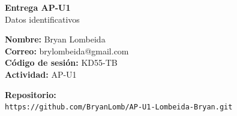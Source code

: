 \documentclass[12pt]{article}
\begin{document}
\begin{center}
  {\Large \bfseries Entrega AP-U1}\\[0.4em]
  Datos identificativos
\end{center}

\vspace{1em}

\noindent
\textbf{Nombre:} Bryan Lombeida\\
\textbf{Correo:} brylombeida@gmail.com\\
\textbf{Código de sesión:} KD55-TB\\
\textbf{Actividad:} AP-U1

\vspace{1.5em}

\noindent
\textbf{Repositorio:}\\
\texttt{https://github.com/BryanLomb/AP-U1-Lombeida-Bryan.git}
\end{document}
